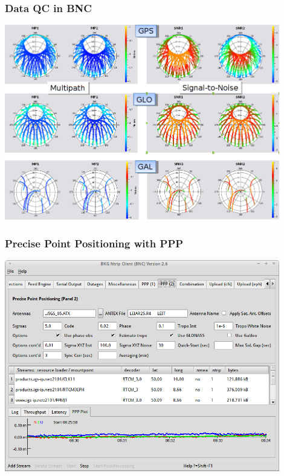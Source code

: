 \documentclass[10pt]{beamer}
\begin{document}

\begin{frame}
  \frametitle{Data QC in BNC}
  \begin{center}
    \includegraphics[width=0.9\textwidth,angle=0]{bnc_qc1.png}
  \end{center}
\end {frame}


\begin{frame}
  \frametitle{Precise Point Positioning with PPP}
  \begin{center}
    \includegraphics[width=0.9\textwidth,angle=0]{ppp1.png}
  \end{center}
\end {frame}
\end{document}
